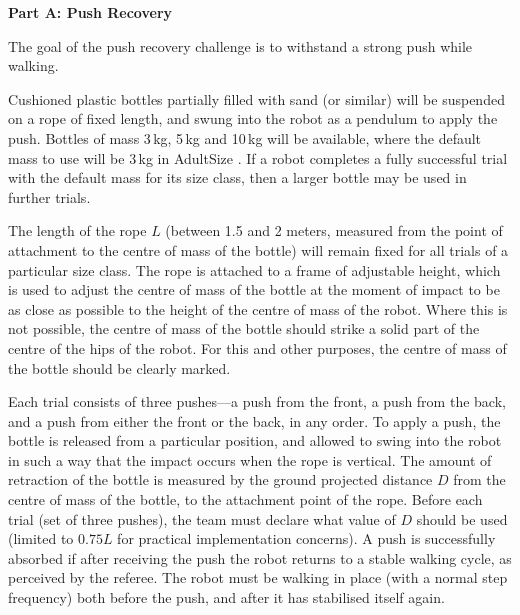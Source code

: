 \clearpage
\sffamily
{\bfseries\color[rgb]{0.4,0.4,0.4}
Part A: Push Recovery }
{}


\bigskip

The goal of the push recovery challenge is to withstand a strong push while walking. 

Cushioned plastic bottles partially filled with sand (or similar) will be
suspended on a rope of fixed length,
and swung into the robot as a pendulum to apply the push.
Bottles of mass  3$\,$kg, 5$\,$kg and 10$\,$kg will be available,
where the default mass to use will be
3$\,$kg in AdultSize .
If a robot completes a fully successful trial with the default mass for its size
class, then a larger bottle may be used in further trials.

\medskip
The length of the rope $L$ (between 1.5 and 2 meters, measured from the point of 
attachment to the centre of mass of the bottle) will remain fixed for all trials 
of a particular size class.
The rope is attached to a frame of adjustable height,
which is used to adjust the centre of mass of the bottle at the moment of impact
to be as close as possible to the height of the centre of mass of the robot.
Where this is not possible, the centre of mass of the bottle should strike a solid part
of the centre of the hips of the robot.
For this and other purposes, the centre of mass of the bottle should be clearly marked.

\medskip
Each trial consists of three pushes---a push from the front, a push from the back, and a push from either the front or the back, in any order. To apply a push, the bottle is released from a particular position, and allowed to swing into the robot in such a way that the impact occurs when the rope is vertical. The amount of retraction of the bottle is measured by the ground projected distance $D$ from the centre of mass of the bottle, to the attachment point of the rope. Before each trial (set of three pushes), the team must declare what value of $D$ should be used (limited to $0.75L$ for practical implementation concerns). A push is successfully absorbed if after receiving the push the robot 
returns to a stable walking cycle, as perceived by the referee. The robot must be walking in place (with a normal step frequency) both before the push, and after it has stabilised itself again.

